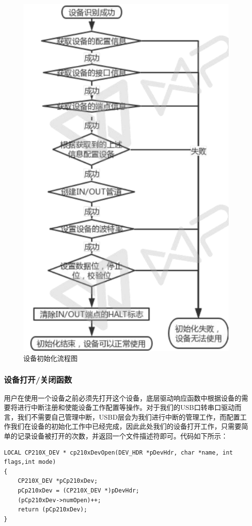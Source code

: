 \begin{figure}[!h]
\centering
\includegraphics[width=.7\textwidth]{./graphics/device-init.pdf}
\caption{设备初始化流程图}\label{fig:device-init}
\end{figure}



\subsubsection{设备打开/关闭函数}

	用户在使用一个设备之前必须先打开这个设备，底层驱动响应函数中根据设备的需要将进行中断注册和使能设备工作配置等操作。对于我们的USB口转串口驱动而言，我们不需要自己管理中断，USBD层会为我们进行中断的管理工作，而配置工作我们在设备的初始化工作中已经完成，因此此处我们的设备打开工作，只需要简单的记录设备被打开的次数，并返回一个文件描述符即可。代码如下所示：
	
\lstset{language=C}
\begin{lstlisting}
LOCAL CP210X_DEV * cp210xDevOpen(DEV_HDR *pDevHdr, char *name, int flags,int mode)
{
	CP210X_DEV *pCp210xDev;
	pCp210xDev = (CP210X_DEV *)pDevHdr;
	(pCp210xDev->numOpen)++;
	return (pCp210xDev);
}
\end{lstlisting}


